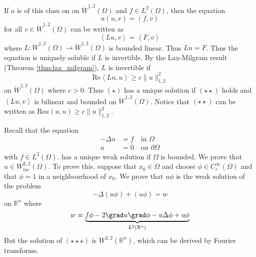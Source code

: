 \documentclass[10pt, oneside, reqno]{amsart}
\theoremstyle{plain}%
\numberwithin{equation}{section}
\theoremstyle{definition}
\theoremstyle{remark}
\newcommand{\R}{\mathbb{R}}
\newcommand{\iprod}[1]{\left\langle #1 \right\rangle}
\renewcommand{\Re}{\text{Re}}
\begin{document}
    If $a$ is of this class on on $\dot W^{1, 2}(\Omega)$ and $f \in L^2(\Omega)$, then the equation 
    \[ 
        a(u, v) = (f, v)
        \tag{$\star$}
    \] for all $v \in \dot W^{1, 2}(\Omega)$ can be written as \[
        \iprod{Lu, v} = \iprod{F, v}
    \] where $L: \dot W^{1, 2}(\Omega) \rightarrow \dot W^{1, 2}(\Omega)$ is bounded linear.  Thus $Lu = F$.  Thus the equation is uniquely soluble if $L$ is invertible.  By the Lax-Milgram result (Theorem \ref{thm:lax_milgram}), $L$ is invertible if \[
    \Re \iprod{Lu, u} \geq c \| u \|^2_{1, 2}
    \tag{$\star \star$}
    \]
    on $\dot W^{1, 2}(\Omega)$ where $c > 0$.  Thus $(\star)$ has a unique solution if $(\star \star)$ holds and $\iprod{Lu, v}$ is bilinear and bounded on $\dot W^{1, 2}(\Omega)$.  Notice that $(\star \star)$ can be written as $\Re a(u, u) \geq c \| u \|_{1, 2}^2$.  

Recall that the equation \begin{align*}
    -\Delta u &= f \quad \text{in $\Omega$}\\
        u &= 0 \quad \text{on $\partial \Omega$}
\end{align*} with $f \in L^2(\Omega)$.
has a unique weak solution if $\Omega$ is bounded.  We prove that $u \in W^{2, 2}_{loc}(\Omega)$.  To prove this, suppose that $x_0 \in \Omega$ and choose $\phi \in C^\infty_c(\Omega)$ and that $\phi = 1$ in a neighbourhood of $x_0$.  We prove that $u \phi$ is the weak solution of the problem \[
    - \Delta (u \phi) + (u \phi) = w 
    \tag{$\star \star \star$}
\]  on $\R^n$ where \[
    w = \underbrace{f \phi - 2 \grad u \grad \phi - u \Delta \phi + u \phi}_{L^2(\R^n)}
\]  But the solution of $(\star \star \star)$ is $W^{2,2}(\R^n)$, which can be derived by Fourier transforms.  
\end{document}
